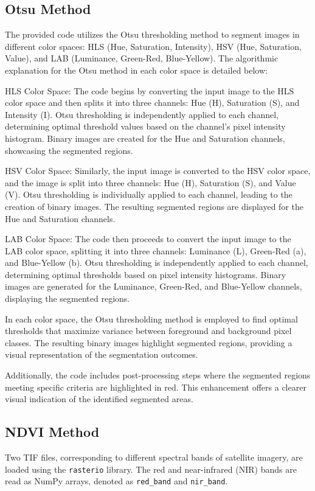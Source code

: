 \documentclass[12pt,a4paper,IEEEtran]{article}
\begin{document}
\subsection{Otsu Method}
The provided code utilizes the Otsu thresholding method to segment images in different color spaces: HLS (Hue, Saturation, Intensity), HSV (Hue, Saturation, Value), and LAB (Luminance, Green-Red, Blue-Yellow). The algorithmic explanation for the Otsu method in each color space is detailed below: 

HLS Color Space: The code begins by converting the input image to the HLS color space and then splits it into three channels: Hue (H), Saturation (S), and Intensity (I). Otsu thresholding is independently applied to each channel, determining optimal threshold values based on the channel's pixel intensity histogram. Binary images are created for the Hue and Saturation channels, showcasing the segmented regions. 

HSV Color Space: Similarly, the input image is converted to the HSV color space, and the image is split into three channels: Hue (H), Saturation (S), and Value (V). Otsu thresholding is individually applied to each channel, leading to the creation of binary images. The resulting segmented regions are displayed for the Hue and Saturation channels. 

LAB Color Space: The code then proceeds to convert the input image to the LAB color space, splitting it into three channels: Luminance (L), Green-Red (a), and Blue-Yellow (b). Otsu thresholding is independently applied to each channel, determining optimal thresholds based on pixel intensity histograms. Binary images are generated for the Luminance, Green-Red, and Blue-Yellow channels, displaying the segmented regions. 

In each color space, the Otsu thresholding method is employed to find optimal thresholds that maximize variance between foreground and background pixel classes. The resulting binary images highlight segmented regions, providing a visual representation of the segmentation outcomes. 

Additionally, the code includes post-processing steps where the segmented regions meeting specific criteria are highlighted in red. This enhancement offers a clearer visual indication of the identified segmented areas. 

\subsection{NDVI Method}
Two TIF files, corresponding to different spectral bands of satellite imagery, are loaded using the \texttt{rasterio} library. The red and near-infrared (NIR) bands are read as NumPy arrays, denoted as \texttt{red\_band} and \texttt{nir\_band}.
\end{document}

